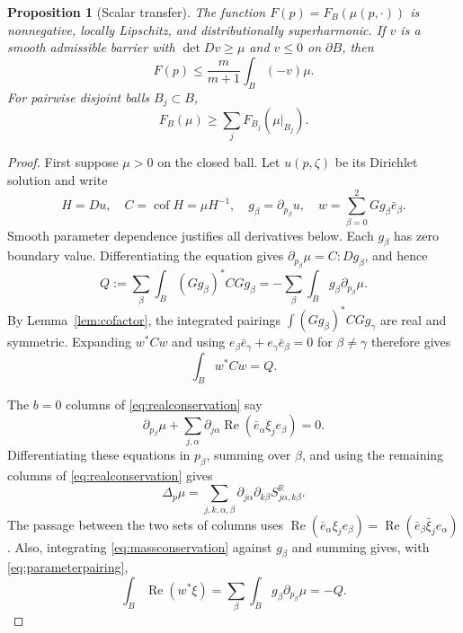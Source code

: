 \documentclass[11pt]{article}
\newtheorem{proposition}{Proposition}
\numberwithin{equation}{section}
\newcommand{\R}{\mathbb R}
\newcommand{\Rea}{\operatorname{Re}}
\DeclareMathOperator{\cof}{cof}
\begin{document}
\begin{proposition}[Scalar transfer]\label{prop:transfer}
The function $F(p)=F_B(\mu(p,\cdot))$ is nonnegative, locally Lipschitz,
and distributionally superharmonic. If $v$ is a smooth admissible
barrier with $\det Dv\ge\mu$ and $v\le0$ on $\partial B$, then
\begin{equation}\label{eq:barrierupper}
 F(p)\le\frac m{m+1}\int_B(-v)\mu.
\end{equation}
For pairwise disjoint balls $B_j\subset B$,
\begin{equation}\label{eq:localization}
 F_B(\mu)\ge\sum_jF_{B_j}(\mu|_{B_j}).
\end{equation}
\end{proposition}
\begin{proof}
First suppose $\mu>0$ on the closed ball. Let $u(p,\zeta)$ be its
Dirichlet solution and write
\[
 H=Du,\quad C=\cof H=\mu H^{-1},\quad
 g_\beta=\partial_{p_\beta}u,\quad
 w=\sum_{\beta=0}^2Gg_\beta\bar e_\beta.
\]
Smooth parameter dependence justifies all derivatives below.
Each $g_\beta$ has zero boundary value.
Differentiating the equation gives
$\partial_{p_\beta}\mu=C:Dg_\beta$, and hence
\begin{equation}\label{eq:parameterpairing}
 Q:=\sum_\beta\int_B(Gg_\beta)^*CGg_\beta
   =-\sum_\beta\int_Bg_\beta\partial_{p_\beta}\mu.
\end{equation}
By Lemma~\ref{lem:cofactor}, the integrated pairings
$\int(Gg_\beta)^*CGg_\gamma$ are real and symmetric.
Expanding $w^*Cw$ and using
$e_\beta\bar e_\gamma+e_\gamma\bar e_\beta=0$ for
$\beta\ne\gamma$ therefore gives
\begin{equation}\label{eq:threepairings}
 \int_Bw^*Cw=Q.
\end{equation}

The $b=0$ columns of \eqref{eq:realconservation} say
\begin{equation}\label{eq:massconservation}
 \partial_{p_\beta}\mu+
 \sum_{j,\alpha}\partial_{j\alpha}
               \Rea(\bar e_\alpha\xi_j e_\beta)=0.
\end{equation}
Differentiating these equations in $p_\beta$, summing over $\beta$,
and using the remaining columns of \eqref{eq:realconservation}
gives
\begin{equation}\label{eq:doubledconservation}
 \Delta_p\mu
 =\sum_{j,k,\alpha,\beta}\partial_{j\alpha}\partial_{k\beta}
                                      S^\R_{j\alpha,k\beta}.
\end{equation}
The passage between the two sets of columns uses
$\Rea(\bar e_\alpha\xi_j e_\beta)
 =\Rea(\bar e_\beta\bar\xi_j e_\alpha)$.
Also, integrating \eqref{eq:massconservation} against $g_\beta$
and summing gives, with \eqref{eq:parameterpairing},
\begin{equation}\label{eq:crosspairing}
 \int_B\Rea(w^*\xi)
 =\sum_\beta\int_Bg_\beta\partial_{p_\beta}\mu=-Q.
\end{equation}


\end{proof}
\end{document}
